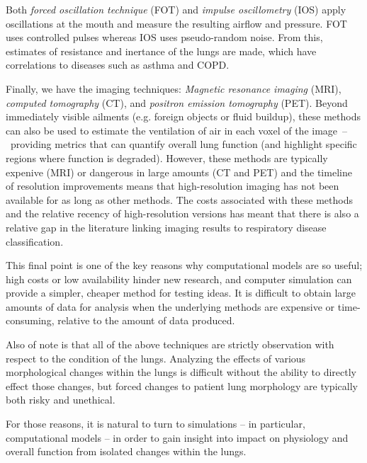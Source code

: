 Both \textit{forced oscillation technique} (FOT) and \textit{impulse oscillometry} (IOS) apply
oscillations at the mouth and measure the resulting airflow and pressure. FOT uses controlled
pulses whereas IOS uses pseudo-random noise. From this, estimates of resistance and inertance of the
lungs are made, which have correlations to diseases such as asthma and COPD.

Finally, we have the imaging techniques: \textit{Magnetic resonance imaging} (MRI), \textit{computed
tomography} (CT), and \textit{positron emission tomography} (PET). Beyond immediately visible
ailments (e.g. foreign objects or fluid buildup), these methods can also be used to estimate the
ventilation of air in each voxel of the image~--~providing metrics that can quantify overall lung
function (and highlight specific regions where function is degraded). However, these methods are
typically expenive (MRI) or dangerous in large amounts (CT and PET) and the timeline of resolution
improvements means that high-resolution imaging has not been available for as long as other methods.
The costs associated with these methods and the relative recency of high-resolution versions has
meant that there is also a relative gap in the literature linking imaging results to respiratory
disease classification.

This final point is one of the key reasons why computational models are so useful; high costs or low
availability hinder new research, and computer simulation can provide a simpler, cheaper method for
testing ideas. It is difficult to obtain large amounts of data for analysis when the underlying
methods are expensive or time-consuming, relative to the amount of data produced.\footnotemark


Also of note is that all of the above techniques are strictly observation with respect to the
condition of the lungs. Analyzing the effects of various morphological changes within the lungs is
difficult without the ability to directly effect those changes, but forced changes to patient lung
morphology are typically both risky and unethical.

For those reasons, it is natural to turn to simulations -- in particular, computational models -- in
order to gain insight into impact on physiology and overall function from isolated changes within
the lungs.

